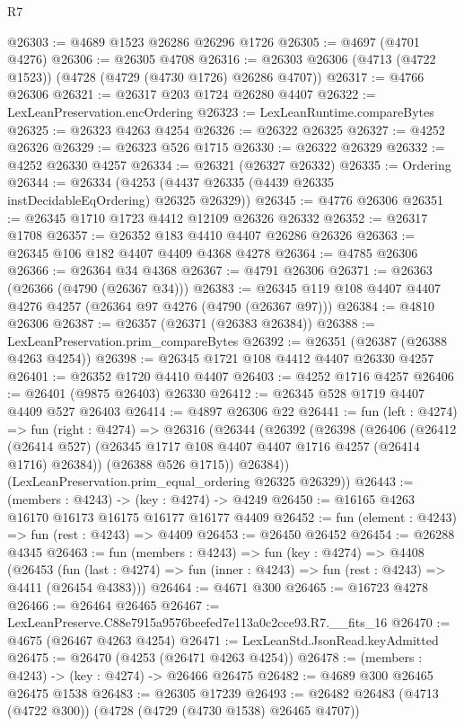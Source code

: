 \begin{lexlean}{R7}
\begin{coremodule}
@26303 := @4689 @1523 @26286 @26296 @1726
@26305 := @4697 (@4701 @4276)
@26306 := @26305 @4708
@26316 := @26303 @26306 (@4713 (@4722 @1523)) (@4728 (@4729 (@4730 @1726) @26286 @4707))
@26317 := @4766 @26306
@26321 := @26317 @203 @1724 @26280 @4407
@26322 := LexLeanPreservation.encOrdering
@26323 := LexLeanRuntime.compareBytes
@26325 := @26323 @4263 @4254
@26326 := @26322 @26325
@26327 := @4252 @26326
@26329 := @26323 @526 @1715
@26330 := @26322 @26329
@26332 := @4252 @26330 @4257
@26334 := @26321 (@26327 @26332)
@26335 := Ordering
@26344 := @26334 (@4253 (@4437 @26335 (@4439 @26335 instDecidableEqOrdering) @26325 @26329))
@26345 := @4776 @26306
@26351 := @26345 @1710 @1723 @4412 @12109 @26326 @26332
@26352 := @26317 @1708
@26357 := @26352 @183 @4410 @4407 @26286 @26326
@26363 := @26345 @106 @182 @4407 @4409 @4368 @4278
@26364 := @4785 @26306
@26366 := @26364 @34 @4368
@26367 := @4791 @26306
@26371 := @26363 (@26366 (@4790 (@26367 @34)))
@26383 := @26345 @119 @108 @4407 @4407 @4276 @4257 (@26364 @97 @4276 (@4790 (@26367 @97)))
@26384 := @4810 @26306
@26387 := @26357 (@26371 (@26383 @26384))
@26388 := LexLeanPreservation.prim_compareBytes
@26392 := @26351 (@26387 (@26388 @4263 @4254))
@26398 := @26345 @1721 @108 @4412 @4407 @26330 @4257
@26401 := @26352 @1720 @4410 @4407
@26403 := @4252 @1716 @4257
@26406 := @26401 (@9875 @26403) @26330
@26412 := @26345 @528 @1719 @4407 @4409 @527 @26403
@26414 := @4897 @26306 @22
@26441 := fun (left : @4274) =>
  fun (right : @4274) =>
  @26316
    (@26344
      (@26392
        (@26398
          (@26406
            (@26412 (@26414 @527) (@26345 @1717 @108 @4407 @4407 @1716 @4257 (@26414 @1716) @26384))
            (@26388 @526 @1715))
          @26384))
      (LexLeanPreservation.prim_equal_ordering @26325 @26329))
@26443 := (members : @4243) -> (key : @4274) -> @4249
@26450 := @16165 @4263 @16170 @16173 @16175 @16177 @16177 @4409
@26452 := fun (element : @4243) => fun (rest : @4243) => @4409
@26453 := @26450 @26452
@26454 := @26288 @4345
@26463 := fun (members : @4243) =>
  fun (key : @4274) =>
  @4408
    (@26453
      (fun (last : @4274) => fun (inner : @4243) => fun (rest : @4243) => @4411 (@26454 @4383)))
@26464 := @4671 @300
@26465 := @16723 @4278
@26466 := @26464 @26465
@26467 := LexLeanPreserve.C88e7915a9576beefed7e113a0c2cce93.R7.__fits_16
@26470 := @4675 (@26467 @4263 @4254)
@26471 := LexLeanStd.JsonRead.keyAdmitted
@26475 := @26470 (@4253 (@26471 @4263 @4254))
@26478 := (members : @4243) -> (key : @4274) -> @26466 @26475
@26482 := @4689 @300 @26465 @26475 @1538
@26483 := @26305 @17239
@26493 := @26482 @26483 (@4713 (@4722 @300)) (@4728 (@4729 (@4730 @1538) @26465 @4707))

\end{coremodule}
\end{lexlean}
